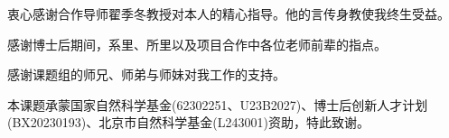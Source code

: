 
\begin{acknowledgements}
  衷心感谢合作导师翟季冬教授对本人的精心指导。他的言传身教使我终生受益。

  感谢博士后期间，系里、所里以及项目合作中各位老师前辈的指点。

  感谢课题组的师兄、师弟与师妹对我工作的支持。





  本课题承蒙国家自然科学基金(62302251、U23B2027)、博士后创新人才计划(BX20230193)、北京市自然科学基金(L243001)资助，特此致谢。
\end{acknowledgements}
